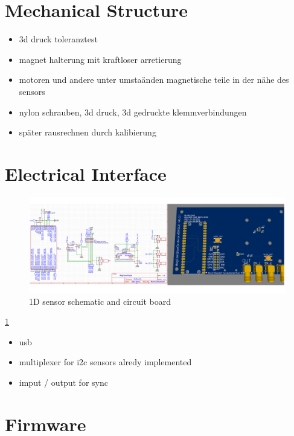 \hypertarget{mechanical-structure}{%
\section{Mechanical Structure}\label{mechanical-structure}}

\begin{itemize}
\tightlist
\item
  3d druck toleranztest
\item
  magnet halterung mit kraftloser arretierung
\item
  motoren und andere unter umstaänden magnetische teile in der nähe des
  sensors
\item
  nylon schrauben, 3d druck, 3d gedruckte klemmverbindungen
\item
  später rausrechnen durch kalibierung
\end{itemize}

\hypertarget{electrical-interface}{%
\section{Electrical Interface}\label{electrical-interface}}

\begin{figure}
\centering
\includegraphics{./generated_images/border_1D_sensor_schematic_and_circuit_board.png}
\caption{1D sensor schematic and circuit board
\label{1D_sensor_schematic_and_circuit_board.png}}
\end{figure}

\ref{1D_sensor_schematic_and_circuit_board.png}

\begin{itemize}
\tightlist
\item
  usb
\item
  multiplexer for i2c sensors alredy implemented
\item
  imput / output for sync
\end{itemize}

\hypertarget{firmware}{%
\section{Firmware}\label{firmware}}

